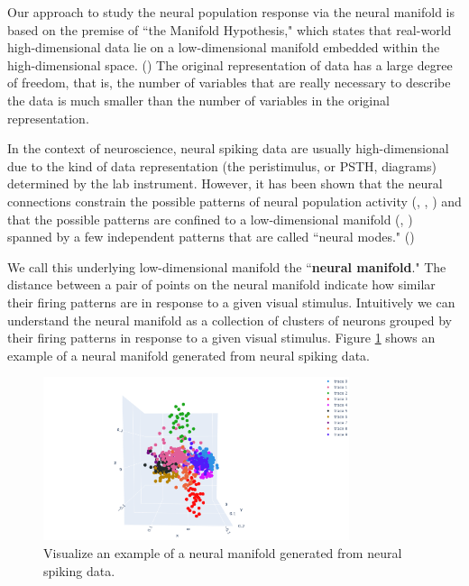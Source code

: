 Our approach to study the neural population response via the neural manifold is based on the premise of ``the Manifold Hypothesis," which states that real-world high-dimensional data lie on a low-dimensional manifold embedded within the high-dimensional space. (\cite{deepai_2019}) The original representation of data has a large degree of freedom, that is, the number of variables that are really necessary to describe the data is much smaller than the number of variables in the original representation. 


In the context of neuroscience, neural spiking data are usually high-dimensional due to the kind of data representation (the peristimulus, or PSTH, diagrams) determined by the lab instrument. However, it has been shown that the neural connections constrain the possible patterns of neural population activity (\cite{okun_diverse_2015}, \cite{sadtler_neural_2014}, \cite{tsodyks_attractor_1999}) and that the possible patterns are confined to a low-dimensional manifold (\cite{stopfer_intensity_2003},  \cite{yu_gaussian-process_2009}) spanned by a few independent patterns that are called ``neural modes." (\cite{gallego_neural_2017})

We call this underlying low-dimensional manifold the ``\textbf{neural manifold}." The distance between a pair of points on the neural manifold indicate how similar their firing patterns are in response to a given visual stimulus. Intuitively we can understand the neural manifold as a collection of clusters of neurons grouped by their firing patterns in response to a given visual stimulus. Figure \ref{fig:neural-manifold-eg} shows an example of a neural manifold generated from neural spiking data. 

 
      \begin{figure}[H]
        \centering
      \includegraphics[width=0.8\textwidth]{figures/embeddings/embedding-lab.png}
      \caption{Visualize an example of a neural manifold generated from neural spiking data.}
      \label{fig:neural-manifold-eg}
            \end{figure} 
            

